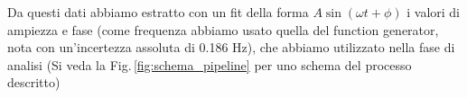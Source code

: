 \documentclass[../Relazione_circuiti]{subfiles}
\begin{document}
  Da questi dati abbiamo estratto con un fit della forma $ A \sin\left( \omega t + \phi \right) $ i valori di ampiezza e
  fase (come frequenza abbiamo usato quella del function generator, nota con un'incertezza assoluta di 0.186 Hz), che
  abbiamo utilizzato nella fase di analisi (Si veda la Fig.\,\ref{fig:schema_pipeline} per uno schema del processo
  descritto)
  


%
%
\end{document}
